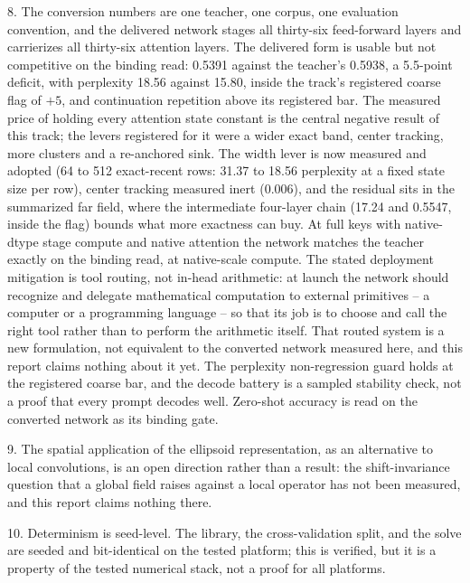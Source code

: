 \documentclass[11pt]{article}
\begin{document}
8. The conversion numbers are one teacher, one corpus, one
   evaluation convention, and the delivered network stages all
   thirty-six feed-forward layers and carrierizes all thirty-six
   attention layers. The delivered form is usable but not
   competitive on the binding read: 0.5391 against the teacher's
   0.5938, a 5.5-point deficit, with perplexity 18.56 against
   15.80, inside the track's registered coarse flag of $+5$, and
   continuation repetition above its registered bar. The measured
   price of holding every attention state constant is the central
   negative result of this track; the levers registered for it
   were a wider exact band, center tracking, more clusters and a
   re-anchored sink. The width lever is now measured and adopted
   (64 to 512 exact-recent rows: 31.37 to 18.56 perplexity at a
   fixed state size per row), center tracking measured inert
   (0.006), and the residual sits in the summarized far field,
   where the intermediate four-layer chain (17.24
   and 0.5547, inside the flag) bounds what more exactness can
   buy. At full keys
   with native-dtype stage compute and native
   attention the network matches the teacher exactly on the
   binding read, at native-scale compute. The stated deployment
   mitigation is tool routing, not in-head arithmetic: at launch
   the network should recognize and delegate mathematical
   computation to external primitives -- a computer or a
   programming language -- so that its job is to choose and call
   the right tool rather than to perform the arithmetic itself.
   That routed system is a new formulation, not equivalent to
   the converted network measured here, and this report claims
   nothing about it yet. The perplexity
   non-regression guard holds at the registered coarse bar, and
   the decode battery is a sampled stability check, not a proof
   that every prompt decodes well. Zero-shot accuracy is read on
   the converted network as its binding gate.

9. The spatial application of the ellipsoid representation, as an
   alternative to local convolutions, is an open direction rather
   than a result: the shift-invariance question that a global field
   raises against a local operator has not been measured, and this
   report claims nothing there.

10. Determinism is seed-level. The library, the cross-validation
    split, and the solve are seeded and bit-identical on the tested
    platform; this is verified, but it is a property of the tested
    numerical stack, not a proof for all platforms.
\end{document}
